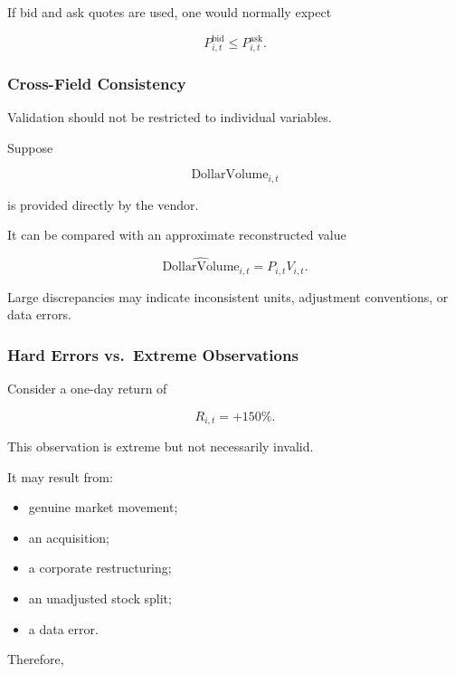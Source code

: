 \documentclass[11pt,a4paper]{article}
\begin{document}
If bid and ask quotes are used, one would normally expect

\begin{equation}
P_{i,t}^{\mathrm{bid}}
\leq
P_{i,t}^{\mathrm{ask}}.
\end{equation}


\subsubsection{Cross-Field Consistency}

Validation should not be restricted to individual variables.

Suppose

\begin{equation}
\mathrm{DollarVolume}_{i,t}
\end{equation}

is provided directly by the vendor.

It can be compared with an approximate reconstructed value

\begin{equation}
\widehat{\mathrm{DollarVolume}}_{i,t}
=
P_{i,t}V_{i,t}.
\end{equation}

Large discrepancies may indicate inconsistent units, adjustment conventions, or
data errors.


\subsubsection{Hard Errors vs.\ Extreme Observations}

Consider a one-day return of

\begin{equation}
R_{i,t}=+150\%.
\end{equation}

This observation is extreme but not necessarily invalid.

It may result from:

\begin{itemize}
    \item genuine market movement;
    \item an acquisition;
    \item a corporate restructuring;
    \item an unadjusted stock split;
    \item a data error.
\end{itemize}

Therefore,
\end{document}
